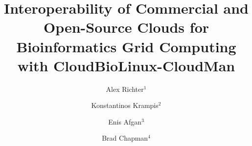 \documentclass[10pt]{bmc_article}
\newenvironment{bmcformat}{\baselineskip20pt\sloppy\setboolean{publ}{false}}{\baselineskip20pt\sloppy}
\begin{document}
\begin{bmcformat}



\title{Interoperability of Commercial and Open-Source Clouds for Bioinformatics Grid Computing with CloudBioLinux-CloudMan}
 

\author{
             Alex Richter$^{1}$%
             \and
             Konstantinos Krampis\correspondingauthor$^{2}$%
             \and
             Enis Afgan\correspondingauthor$^{3}$%
             \and
             Brad Chapman\correspondingauthor$^{4}$%
             }



\address{ \\
\iid(1) Informatics Department, J. Craig Venter Institute, 10355 Science Center Dr., San Diego, CA 92121, USA \\
\iid(2) Informatics Department, J. Craig Venter Institute, 9704 Medical Center Dr., Rockville, MD 20850, USA  \\
\iid(3) Center for Informatics and Computing, Ruder Boskovic Institute, Zagreb, Croatia   \\
\iid(4) Dept. of Biostatistics, Harvard School of Public Health, 655 Huntington Avenue, Boston, MA, 02115, USA  \\
}


\end{bmcformat}
\end{document}
